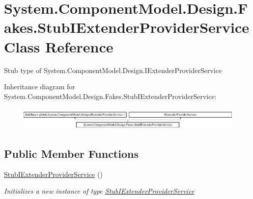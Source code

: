 \hypertarget{class_system_1_1_component_model_1_1_design_1_1_fakes_1_1_stub_i_extender_provider_service}{\section{System.\-Component\-Model.\-Design.\-Fakes.\-Stub\-I\-Extender\-Provider\-Service Class Reference}
\label{class_system_1_1_component_model_1_1_design_1_1_fakes_1_1_stub_i_extender_provider_service}
}


Stub type of System.\-Component\-Model.\-Design.\-I\-Extender\-Provider\-Service 


Inheritance diagram for System.\-Component\-Model.\-Design.\-Fakes.\-Stub\-I\-Extender\-Provider\-Service\-:\begin{figure}[H]
\begin{center}
\leavevmode
\includegraphics[height=1.191489cm]{class_system_1_1_component_model_1_1_design_1_1_fakes_1_1_stub_i_extender_provider_service}
\end{center}
\end{figure}
\subsection*{Public Member Functions}
\begin{DoxyCompactItemize}
\item 
\hyperlink{class_system_1_1_component_model_1_1_design_1_1_fakes_1_1_stub_i_extender_provider_service_a4bf0e7cc292f9cbc5ed0a827251af7db}{Stub\-I\-Extender\-Provider\-Service} ()
\begin{DoxyCompactList}\small\item\em Initializes a new instance of type \hyperlink{class_system_1_1_component_model_1_1_design_1_1_fakes_1_1_stub_i_extender_provider_service}{Stub\-I\-Extender\-Provider\-Service}\end{DoxyCompactList}\end{DoxyCompactItemize}
